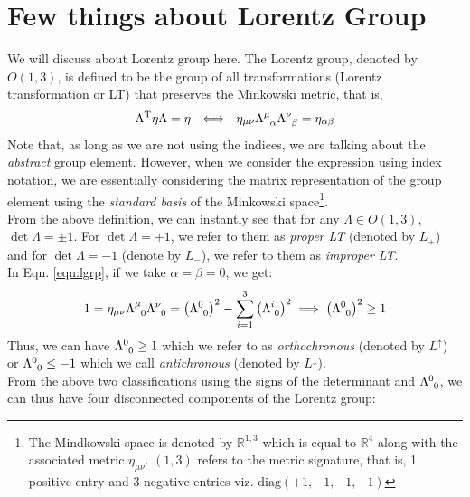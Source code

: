 \section{Few things about Lorentz Group}
We will discuss about Lorentz group here. The Lorentz group, denoted by $O(1,3)$, is defined to be the group of all transformations (Lorentz transformation or LT) that preserves the Minkowski metric, that is,
\begin{equation}\label{eqn:lgrp}
    \Lambda^\mathrm{T} \eta \Lambda = \eta\ \iff \ \eta_{\mu\nu}\trmat{\mu}{\alpha}\trmat{\nu}{\beta}=\eta_{\alpha\beta}
\end{equation}
Note that, as long as we are not using the indices, we are talking about the \textit{abstract} group element. However, when we consider the expression using index notation, we are essentially considering the matrix representation of the group element using the \textit{standard basis} of the Minkowski space\footnote{The Mindkowski space is denoted by $\mathbb{R}^{1,3}$ which is equal to $\mathbb{R}^4$ along with the associated metric $\eta_{\mu\nu}$. $(1,3)$ refers to the metric signature, that is, 1 positive entry and 3 negative entries viz. $\mathrm{diag}(+1,-1,-1,-1)$}.\\[0.2cm] From the above definition, we can instantly see that for any $\Lambda \in O(1,3)$, $\det\Lambda = \pm 1$. For $\det \Lambda =+1$, we refer to them as \textit{proper LT} (denoted by $L_{+}$) and for $\det \Lambda =-1$ (denote by $L_-$), we refer to them as \textit{improper LT}.\\
In Eqn. \ref{eqn:lgrp}, if we take $\alpha=\beta=0$, we get:
\begin{align*}
   1 =  \eta_{\mu\nu}\trmat{\mu}{0}\trmat{\nu}{0} =\qty( \trmat{0}{0})^2 - \sum\limits_{i=1}^3 \qty( \trmat{i}{0})^2 \implies \qty( \trmat{0}{0})^2 \geq 1
\end{align*}
Thus, we can have $\trmat{0}{0}\geq 1$ which we refer to as \textit{orthochronous} (denoted by $L^{\uparrow}$) or $\trmat{0}{0}\leq -1$ which we call \textit{antichronous} (denoted by $L^{\downarrow}$). \\[0.2cm]
From the above two classifications using the signs of the determinant and $\trmat{0}{0}$, we can thus have four disconnected components of the Lorentz group:
